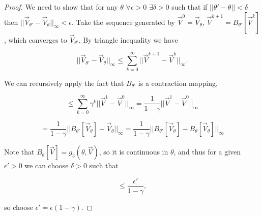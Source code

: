 \documentclass{journal}
\begin{document}
\begin{proof}
We need to show that for any $\theta$ $\forall \epsilon>0$ $\exists \delta>0$ such that if $||\theta'-\theta|| < \delta$ then $||\vec{V}_{\theta'} - \vec{V}_{\theta}||_{\infty} < \epsilon$. Take the sequence generated by $\vec{V}^0=\vec{V}_{\theta}$,  $\vec{V}^{k+1}=B_{\theta'}[\vec{V}^{k}]$, which converges to $\vec{V}_{\theta'}$. By triangle inequality we have

\begin{equation*}
||\vec{V}_{\theta'} - \vec{V}_{\theta}||_{\infty} \leq \sum_{k=0}^{\infty}||\vec{V}^{k+1}-\vec{V}^{k}||_{\infty}.
\end{equation*}

\noindent We can recursively apply the fact that $B_{\theta'}$ is a contraction mapping, 

\begin{equation*}
\leq \sum_{k=0}^{\infty}\gamma^k||\vec{V}^{1}-\vec{V}^{0}||_{\infty} = \frac{1}{1-\gamma}||\vec{V}^{1}-\vec{V}^{0}||_{\infty}
\end{equation*} 

\begin{equation*}
=\frac{1}{1-\gamma}||B_{\theta'}[\vec{V}_{\theta}]-\vec{V}_{\theta}||_{\infty}=\frac{1}{1-\gamma}||B_{\theta'}[\vec{V}_{\theta}]-B_{\theta}[\vec{V}_{\theta}]||_{\infty}
\end{equation*}

\noindent Note that $B_{\theta}[\vec{V}]=g_3(\theta,\vec{V})$, so it is continuous in $\theta$, and thus for a given $\epsilon'>0$ we can choose $\delta>0$ such that 

\begin{equation}
\leq \frac{\epsilon'}{1-\gamma},
\end{equation}

\noindent so choose $\epsilon' = \epsilon (1-\gamma)$.

\end{proof}
\end{document}

